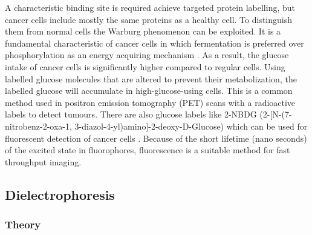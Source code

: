 \documentclass[final]{jyflluk}
\begin{document}
A characteristic binding site is required achieve targeted protein labelling, but cancer cells include mostly the same proteins as a healthy cell. To distinguish them from normal cells the Warburg phenomenon can be exploited. It is a fundamental characteristic of cancer cells in which fermentation is preferred over phosphorylation as an energy acquiring mechanism \cite{warburg1927metabolism}. As a result, the glucose intake of cancer cells is significantly higher compared to regular cells. Using labelled glucose molecules that are altered to prevent their metabolization, the labelled glucose will accumulate in high-glucose-using cells. This is a common method used in positron emission tomography (PET) scans with a radioactive labels to detect tumours. There are also glucose labels like 2-NBDG (2-[N-(7-nitrobenz-2-oxa-1, 3-diazol-4-yl)amino]-2-deoxy-D-Glucose) which can be used for fluorescent detection of cancer cells \cite{cai20132}. Because of the short lifetime (nano seconds) of the excited state in fluorophores, fluorescence is a suitable method for fast throughput imaging.


\newpage
\subsection{Dielectrophoresis}
\label{sec:x3}
\subsubsection{Theory}
\label{sex:x3.1}
\end{document}
